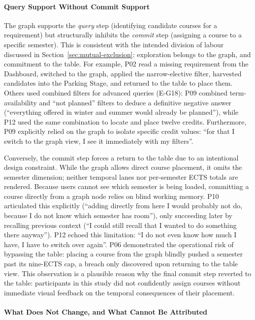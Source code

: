 \paragraph{Query Support Without Commit Support}
\label{sec:eval-graphrole}

The graph supports the \emph{query} step (identifying candidate courses for a requirement) but structurally inhibits the \emph{commit} step (assigning a course to a specific semester). This is consistent with the intended division of labour discussed in Section~\ref{sec:mutual-exclusion}: exploration belongs to the graph, and commitment to the table. For example, P02 read a missing requirement from the Dashboard, switched to the graph, applied the narrow-elective filter, harvested candidates into the Parking Stage, and returned to the table to place them. Others used combined filters for advanced queries (E-G18): P09 combined term-availability and \enquote{not planned} filters to deduce a definitive negative answer (\enquote{everything offered in winter and summer would already be planned}), while P12 used the same combination to locate and place twelve credits. Furthermore, P09 explicitly relied on the graph to isolate specific credit values: \enquote{for that I switch to the graph view, I see it immediately with my filters}.

Conversely, the commit step forces a return to the table due to an intentional design constraint. While the graph allows direct course placement, it omits the semester dimension; neither temporal lanes nor per-semester ECTS totals are rendered. Because users cannot see which semester is being loaded, committing a course directly from a graph node relies on blind working memory. P10 articulated this explicitly (\enquote{adding directly from here I would probably not do, because I do not know which semester has room}), only succeeding later by recalling previous context (\enquote{I could still recall that I wanted to do something there anyway}). P12 echoed this limitation: \enquote{I do not even know how much I have, I have to switch over again}. P06 demonstrated the operational risk of bypassing the table: placing a course from the graph blindly pushed a semester past its nine-ECTS cap, a breach only discovered upon returning to the table view. This observation is a plausible reason why the final commit step reverted to the table: participants in this study did not confidently assign courses without immediate visual feedback on the temporal consequences of their placement.

\paragraph{What Does Not Change, and What Cannot Be Attributed}
\label{sec:eval-accuracy}

